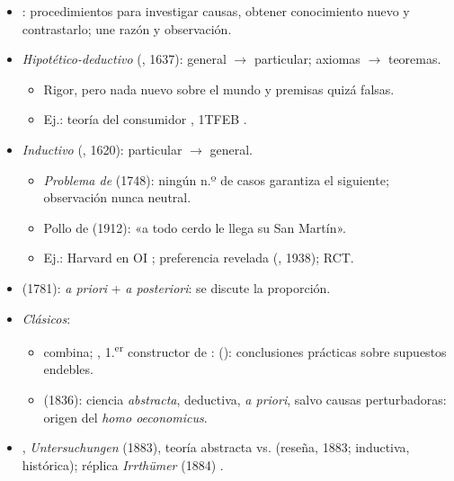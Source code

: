 \documentclass{article}
\begin{document}
\begin{columnas}
\begin{itemize}
\item {}: procedimientos para investigar causas, obtener conocimiento nuevo y contrastarlo; une razón y observación.
\end{itemize}
\begin{itemize}
\item \emph{Hipotético-deductivo} (, 1637): general $\to$ particular; axiomas $\to$ teoremas.
  \begin{itemize}
  \item Rigor, pero nada nuevo sobre el mundo y premisas quizá falsas.
  \item Ej.: teoría del consumidor , 1TFEB .
  \end{itemize}
\item \emph{Inductivo} (, 1620): particular $\to$ general.
  \begin{itemize}
  \item \emph{Problema de } (1748): ningún n.º de casos garantiza el siguiente; observación nunca neutral.
  \item Pollo de  (1912): «a todo cerdo le llega su San Martín».
  \item Ej.: Harvard en OI ; preferencia revelada (, 1938); RCT.
  \end{itemize}
\item {} (1781): \emph{a priori} + \emph{a posteriori}: se discute la proporción.
\item \emph{Clásicos}:
  \begin{itemize}
  \item {} combina; , 1.\textsuperscript{er} constructor de :  (): conclusiones prácticas sobre supuestos endebles.
  \item {} (1836): ciencia \emph{abstracta}, deductiva, \emph{a priori}, salvo causas perturbadoras: origen del \emph{homo oeconomicus}.
    \end{itemize}
\end{itemize}
\begin{itemize}
\item {}, \emph{Untersuchungen} (1883), teoría abstracta vs.  (reseña, 1883; inductiva, histórica); réplica \emph{Irrthümer} (1884) .

\end{itemize}
\end{columnas}
\end{document}
